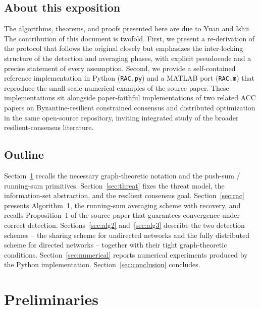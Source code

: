 \documentclass[journal]{IEEEtran}
\begin{document}
\subsection{About this exposition}
The algorithms, theorems, and proofs presented here are due to Yuan and
Ishii.  The contribution of this document is twofold.  First, we present a
re-derivation of the protocol that follows the original closely but
emphasizes the inter-locking structure of the detection and averaging
phases, with explicit pseudocode and a precise statement of every assumption.
Second, we provide a self-contained reference implementation in Python
(\texttt{RAC.py}) and a MATLAB port (\texttt{RAC.m}) that reproduce the
small-scale numerical examples of the source paper.  These implementations
sit alongside paper-faithful implementations of two related ACC papers
on Byzantine-resilient constrained consensus and distributed optimization
\cite{zhu2022resilient,zhu2023resilient} in the same open-source repository,
inviting integrated study of the broader resilient-consensus literature.

\subsection{Outline}
Section~\ref{sec:prelim} recalls the necessary graph-theoretic notation and
the push-sum / running-sum primitives.  Section~\ref{sec:threat} fixes the
threat model, the information-set abstraction, and the resilient consensus
goal.  Section~\ref{sec:rac} presents Algorithm~1, the running-sum averaging
scheme with recovery, and recalls Proposition~1 of the source paper that
guarantees convergence under correct detection.
Sections~\ref{sec:alg2} and~\ref{sec:alg3} describe the two detection
schemes -- the sharing scheme for undirected networks and the fully
distributed scheme for directed networks -- together with their tight
graph-theoretic conditions.  Section~\ref{sec:numerical} reports numerical
experiments produced by the Python implementation.
Section~\ref{sec:conclusion} concludes.

\section{Preliminaries}
\label{sec:prelim}
\end{document}
